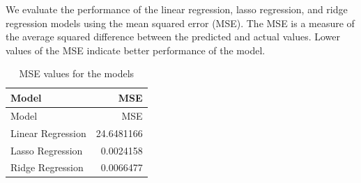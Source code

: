 \documentclass[
]{article}
\newenvironment{Shaded}{\begin{snugshade}}{\end{snugshade}}
\newcommand{\AttributeTok}[1]{\textcolor[rgb]{0.13,0.29,0.53}{#1}}
\newcommand{\DecValTok}[1]{\textcolor[rgb]{0.00,0.00,0.81}{#1}}
\newcommand{\FunctionTok}[1]{\textcolor[rgb]{0.13,0.29,0.53}{\textbf{#1}}}
\newcommand{\NormalTok}[1]{#1}
\newcommand{\OtherTok}[1]{\textcolor[rgb]{0.56,0.35,0.01}{#1}}
\newcommand{\SpecialCharTok}[1]{\textcolor[rgb]{0.81,0.36,0.00}{\textbf{#1}}}
\newcommand{\StringTok}[1]{\textcolor[rgb]{0.31,0.60,0.02}{#1}}
\begin{document}
We evaluate the performance of the linear regression, lasso regression,
and ridge regression models using the mean squared error (MSE). The MSE
is a measure of the average squared difference between the predicted and
actual values. Lower values of the MSE indicate better performance of
the model.

\begin{Shaded}
\end{Shaded}

\begin{longtable}[]{@{}lr@{}}
\caption{MSE values for the models}\tabularnewline
\toprule\noalign{}
Model & MSE \\
\midrule\noalign{}
\endfirsthead
\toprule\noalign{}
Model & MSE \\
\midrule\noalign{}
\endhead
\bottomrule\noalign{}
\endlastfoot
Linear Regression & 24.6481166 \\
Lasso Regression & 0.0024158 \\
Ridge Regression & 0.0066477 \\
\end{longtable}
\end{document}
